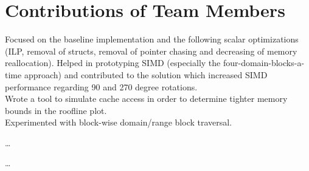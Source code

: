\section{Contributions of Team Members}

 Focused on the baseline implementation and the following scalar optimizations 
(ILP, removal of structs, removal of pointer chasing and decreasing of memory reallocation). 
Helped in prototyping SIMD (especially the four-domain-blocks-a-time approach) 
and contributed to the solution which increased SIMD performance regarding 90 and 270 degree rotations. \\
Wrote a tool to simulate cache access in order to determine tighter memory bounds in the roofline plot. \\
Experimented with block-wise domain/range block traversal.

 \dots

 \dots

